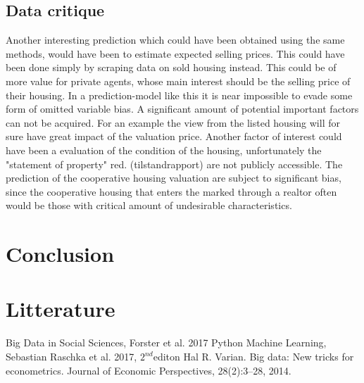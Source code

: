 \documentclass[12pt,a4paper]{article}
\begin{document}
\subsection{Data critique}
Another interesting prediction which could have been obtained using the same methods, would have been to estimate expected selling prices. This could have been done simply by scraping data on sold housing instead. This could be of more value for private agents, whose main interest should be the selling price of their housing. 
\newline 
In a prediction-model like this it is near impossible to evade some form of omitted variable bias. A significant amount of potential important factors can not be acquired. For an example the view from the listed housing will for sure have great impact of the valuation price. Another factor of interest could have been a evaluation of the condition of the housing, unfortunately the "statement of property" red. (tilstandrapport) are not publicly accessible. \newline
The prediction of the cooperative housing valuation %
are subject to significant bias, since the cooperative housing that enters the marked through a realtor often would be those with critical amount of undesirable characteristics. 
\section{Conclusion}


\newpage
\section{Litterature}

Big Data in Social Sciences, Forster et al. 2017
\newline Python Machine Learning, Sebastian Raschka et al. 2017, $2^{nd}$editon
\newline Hal R. Varian. Big data: New tricks for econometrics. Journal of Economic Perspectives, 28(2):3–28, 2014.
\end{document}
